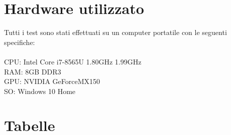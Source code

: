\documentclass{article}
\begin{document}
\section{Hardware utilizzato}
Tutti i test sono stati effettuati su un computer portatile con le seguenti specifiche:\\
\\
CPU: Intel Core i7-8565U 1.80GHz 1.99GHz\\
RAM: 8GB DDR3\\
GPU: NVIDIA GeForceMX150\\
SO: Windows 10 Home

\newpage

\section{Tabelle}
\end{document}
